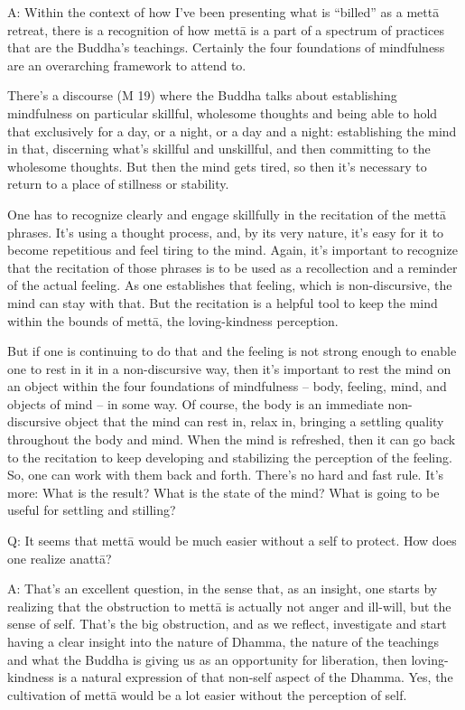 \qaspace
A: Within the context of how I’ve been presenting what is “billed” as a
mettā retreat, there is a recognition of how mettā is a part of a
spectrum of practices that are the Buddha’s teachings. Certainly the
four foundations of mindfulness are an overarching framework to attend
to.

There’s a discourse (M 19) where the Buddha talks about establishing
mindfulness on particular skillful, wholesome thoughts and being able to
hold that exclusively for a day, or a night, or a day and a night:
establishing the mind in that, discerning what’s skillful and
unskillful, and then committing to the wholesome thoughts. But then the
mind gets tired, so then it’s necessary to return to a place of
stillness or stability.

One has to recognize clearly and engage skillfully in the recitation of
the mettā phrases. It’s using a thought process, and, by its very
nature, it’s easy for it to become repetitious and feel tiring to the
mind. Again, it’s important to recognize that the recitation of those
phrases is to be used as a recollection and a reminder of the actual
feeling. As one establishes that feeling, which is non-discursive, the
mind can stay with that. But the recitation is a helpful tool to keep
the mind within the bounds of mettā, the loving-kindness perception.

But if one is continuing to do that and the feeling is not strong enough
to enable one to rest in it in a non-discursive way, then it’s important
to rest the mind on an object within the four foundations of mindfulness
– body, feeling, mind, and objects of mind – in some way. Of course, the
body is an immediate non-discursive object that the mind can rest in,
relax in, bringing a settling quality throughout the body and mind. When
the mind is refreshed, then it can go back to the recitation to keep
developing and stabilizing the perception of the feeling. So, one can
work with them back and forth. There’s no hard and fast rule. It’s more:
What is the result? What is the state of the mind? What is going to be
useful for settling and stilling?

\qaspace
Q: It seems that mettā would be much easier without a self to protect.
How does one realize anattā?

\qaspace
A: That’s an excellent question, in the sense that, as an insight, one
starts by realizing that the obstruction to mettā is actually not anger
and ill-will, but the sense of self. That’s the big obstruction, and as
we reflect, investigate and start having a clear insight into the nature
of Dhamma, the nature of the teachings and what the Buddha is giving us
as an opportunity for liberation, then loving-kindness is a natural
expression of that non-self aspect of the Dhamma. Yes, the cultivation
of mettā would be a lot easier without the perception of self.

